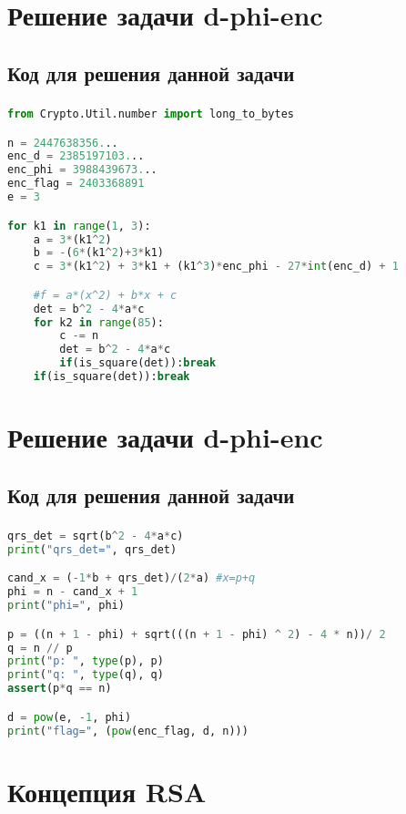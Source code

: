 \documentclass[t]{beamer}
\begin{document}
\section{Решение задачи d-phi-enc}
\subsection{Код для решения данной задачи}
\begin{frame}[fragile]
	\frametitle{\insertsection} 
	\framesubtitle{\insertsubsection}
	\footnotesize
	\smaller
\begin{lstlisting}[language=Python]
from Crypto.Util.number import long_to_bytes

n = 2447638356...
enc_d = 2385197103...
enc_phi = 3988439673...
enc_flag = 2403368891
e = 3

for k1 in range(1, 3):
    a = 3*(k1^2)
    b = -(6*(k1^2)+3*k1)
    c = 3*(k1^2) + 3*k1 + (k1^3)*enc_phi - 27*int(enc_d) + 1

    #f = a*(x^2) + b*x + c
    det = b^2 - 4*a*c
    for k2 in range(85):
        c -= n
        det = b^2 - 4*a*c
        if(is_square(det)):break
    if(is_square(det)):break
\end{lstlisting}	
\end{frame}

\section{Решение задачи d-phi-enc}
\subsection{Код для решения данной задачи}
\begin{frame}[fragile]
	\frametitle{\insertsection} 
	\framesubtitle{\insertsubsection}
	\footnotesize
	\smaller
\begin{lstlisting}[language=Python]
qrs_det = sqrt(b^2 - 4*a*c)
print("qrs_det=", qrs_det)

cand_x = (-1*b + qrs_det)/(2*a) #x=p+q
phi = n - cand_x + 1
print("phi=", phi)

p = ((n + 1 - phi) + sqrt(((n + 1 - phi) ^ 2) - 4 * n))/ 2
q = n // p
print("p: ", type(p), p)
print("q: ", type(q), q)
assert(p*q == n)

d = pow(e, -1, phi)
print("flag=", (pow(enc_flag, d, n)))
\end{lstlisting}	
\end{frame}
\section{Концепция RSA}
\end{document}
